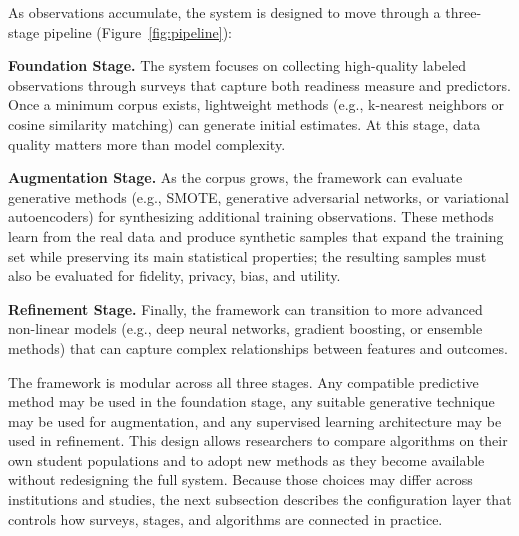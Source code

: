 \documentclass[letterpaper,11pt]{article}
\begin{document}
As observations accumulate, the system is designed to move through a three-stage pipeline (Figure~\ref{fig:pipeline}):

\textbf{Foundation Stage.} The system focuses on collecting high-quality labeled observations through surveys that capture both readiness measure and predictors. Once a minimum corpus exists, lightweight methods (e.g., k-nearest neighbors or cosine similarity matching) can generate initial estimates. At this stage, data quality matters more than model complexity.

\textbf{Augmentation Stage.} As the corpus grows, the framework can evaluate generative methods (e.g., SMOTE, generative adversarial networks, or variational autoencoders) for synthesizing additional training observations. These methods learn from the real data and produce synthetic samples that expand the training set while preserving its main statistical properties; the resulting samples must also be evaluated for fidelity, privacy, bias, and utility.

\textbf{Refinement Stage.} Finally, the framework can transition to more advanced non-linear models (e.g., deep neural networks, gradient boosting, or ensemble methods) that can capture complex relationships between features and outcomes.

The framework is modular across all three stages. Any compatible predictive method may be used in the foundation stage, any suitable generative technique may be used for augmentation, and any supervised learning architecture may be used in refinement. This design allows researchers to compare algorithms on their own student populations and to adopt new methods as they become available without redesigning the full system. Because those choices may differ across institutions and studies, the next subsection describes the configuration layer that controls how surveys, stages, and algorithms are connected in practice.
\end{document}
